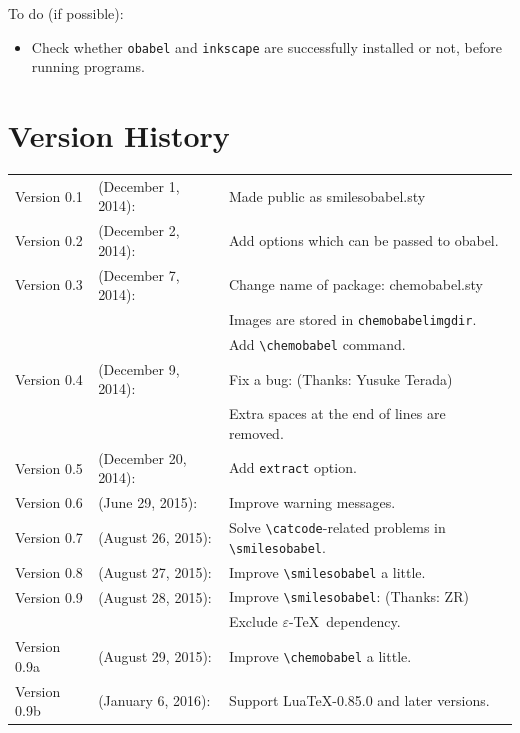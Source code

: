 \documentclass[12pt]{jsarticle}
\begin{document}
\clearpage

To do (if possible):
\begin{itemize}
\item Check whether \texttt{obabel} and \texttt{inkscape} are successfully installed or not, before running programs.
\end{itemize}

\section{Version History}

\begin{table}[h]
\centering
\begin{tabular}{lll}
Version 0.1 & (December  1, 2014): & Made public as \textsf{smilesobabel.sty} \\
Version 0.2 & (December  2, 2014): & Add options which can be passed to obabel. \\
Version 0.3 & (December  7, 2014): & Change name of package: \textsf{chemobabel.sty} \\
            &                      & Images are stored in \texttt{chemobabelimgdir}. \\
            &                      & Add \verb|\chemobabel| command. \\
Version 0.4 & (December  9, 2014): & Fix a bug: (Thanks: Yusuke Terada) \\
            &                      & Extra spaces at the end of lines are removed. \\
Version 0.5 & (December 20, 2014): & Add \verb|extract| option. \\
Version 0.6 & (June     29, 2015): & Improve warning messages. \\
Version 0.7 & (August   26, 2015): & Solve \verb|\catcode|-related problems in \verb|\smilesobabel|. \\
Version 0.8 & (August   27, 2015): & Improve \verb|\smilesobabel| a little. \\
Version 0.9 & (August   28, 2015): & Improve \verb|\smilesobabel|: (Thanks: ZR) \\
            &                      & Exclude $\varepsilon$-\TeX\ dependency. \\
Version 0.9a & (August   29, 2015): & Improve \verb|\chemobabel| a little. \\
Version 0.9b & (January   6, 2016): & Support Lua\TeX-0.85.0 and later versions.
\end{tabular}
\end{table}
\end{document}
